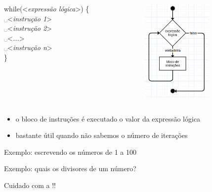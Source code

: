 \documentclass[portuguese,10pt,xcolor=table]{bredelebeamer}
\def\exp[#1]{\color{gray}<\textit{#1}>\color{black}}
\def\espaco{\color{gray}\hspace{0.2cm}\color{black}}
\def\espaco{\color{blue}␣\color{black}}
\begin{document}
    \begin{frame}
		\begin{columns}[t]
			\begin{column}[T]{.6\textwidth}
				while(\exp[expressão lógica]) \{\\
				\espaco \exp[instrução 1]\\
				\espaco \exp[instrução 2]\\
				\espaco \exp[...]\\
				\espaco \exp[instrução n]\\
				\}
			\end{column}
							\begin{column}[T]{.4\textwidth}
								\includegraphics[height=5.0cm]{fluxogramaWhile.png}
							\end{column}
		\end{columns}
		\begin{itemize}
			\item o bloco de instruções é executado  o valor da expressão lógica 
			\item bastante útil quando não sabemos o número de iterações
		\end{itemize}
	\end{frame}

    \begin{frame}
	    Exemplo: escrevendo os números de 1 a 100
			
		
	\end{frame}

    \begin{frame}
	    Exemplo: quais os divisores de um número?
			
		
	\end{frame}
    
	\begin{frame}
		\bcattention \hspace{0.3cm} Cuidado com a !!
			
		
	\end{frame}
	
\end{document}
